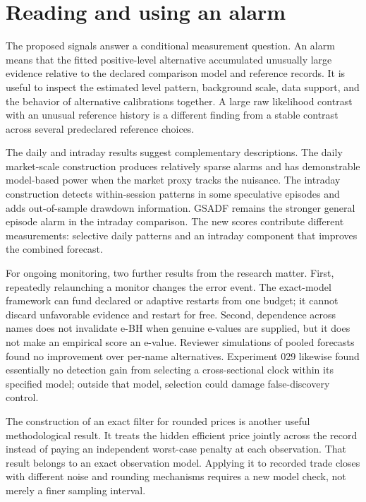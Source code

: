\section{Reading and using an alarm}\label{sec:use}
The proposed signals answer a conditional measurement question. An alarm
means that the fitted positive-level alternative accumulated unusually
large evidence relative to the declared comparison model and reference
records. It is useful to inspect the estimated level pattern, background
scale, data support, and the behavior of alternative calibrations together.
A large raw likelihood contrast with an unusual reference history is a
different finding from a stable contrast across several predeclared
reference choices.

The daily and intraday results suggest complementary descriptions. The
daily market-scale construction produces relatively sparse alarms and
has demonstrable model-based power when the market proxy tracks the
nuisance. The intraday construction detects within-session patterns in
some speculative episodes and adds out-of-sample drawdown information.
GSADF remains the stronger general episode alarm in the intraday
comparison. The new scores contribute different measurements: selective
daily patterns and an intraday component that improves the combined forecast.

For ongoing monitoring, two further results from the research matter.
First, repeatedly relaunching a monitor changes the error event. The
exact-model framework can fund declared or adaptive restarts from one
budget; it cannot discard unfavorable evidence and restart for free.
Second, dependence across names does not invalidate e-BH when genuine
e-values are supplied, but it does not make an empirical score an e-value.
Reviewer simulations of pooled forecasts found no improvement over per-name
alternatives. Experiment 029 likewise found essentially no detection gain
from selecting a cross-sectional clock within its specified model; outside
that model, selection could damage false-discovery control.

The construction of an exact filter for rounded prices is another useful
methodological result. It treats the hidden efficient price jointly across
the record instead of paying an independent worst-case penalty at each
observation. That result belongs to an exact observation model. Applying
it to recorded trade closes with different noise and rounding mechanisms
requires a new model check, not merely a finer sampling interval.

